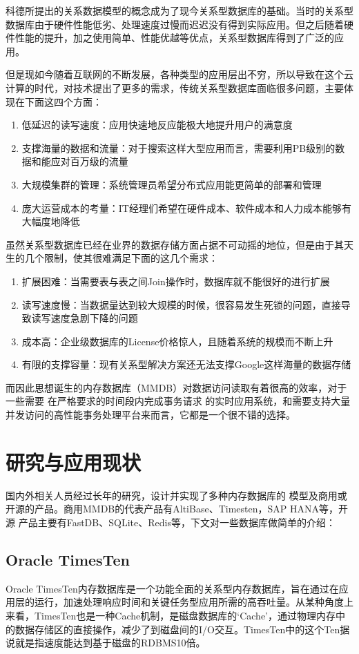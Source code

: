 \documentclass{zjutthesis}
\begin{document}
科德所提出的关系数据模型的概念成为了现今关系型数据库的基础。当时的关系型数据库由于硬件性能低劣、处理速度过慢而迟迟没有得到实际应用。但之后随着硬件性能的提升，加之使用简单、性能优越等优点，关系型数据库得到了广泛的应用。

但是现如今随着互联网的不断发展，各种类型的应用层出不穷，所以导致在这个云计算的时代，对技术提出了更多的需求，传统关系型数据库面临很多问题，主要体现在下面这四个方面：
\begin{enumerate}[label=（\arabic*）]
\item{低延迟的读写速度：应用快速地反应能极大地提升用户的满意度}
\item{支撑海量的数据和流量：对于搜索这样大型应用而言，需要利用PB级别的数据和能应对百万级的流量}
\item{大规模集群的管理：系统管理员希望分布式应用能更简单的部署和管理}
\item{庞大运营成本的考量：IT经理们希望在硬件成本、软件成本和人力成本能够有大幅度地降低}
\end{enumerate}

虽然关系型数据库已经在业界的数据存储方面占据不可动摇的地位，但是由于其天生的几个限制，使其很难满足下面的这几个需求：
\begin{enumerate}[label=（\arabic*）]
\item{扩展困难：当需要表与表之间Join操作时，数据库就不能很好的进行扩展}
\item{读写速度慢：当数据量达到较大规模的时候，很容易发生死锁的问题，直接导致读写速度急剧下降的问题}
\item{成本高：企业级数据库的License价格惊人，且随着系统的规模而不断上升}
\item{有限的支撑容量：现有关系型解决方案还无法支撑Google这样海量的数据存储}
\end{enumerate}

而因此思想诞生的内存数据库（MMDB）对数据访问读取有着很高的效率，对于一些需要
在严格要求的时间段内完成事务请求
的实时应用系统，和需要支持大量并发访问的高性能事务处理平台来而言，它都是一个很不错的选择。

\section{研究与应用现状}
国内外相关人员经过长年的研究，设计并实现了多种内存数据库的
模型及商用或开源的产品。商用MMDB的代表产品有AltiBase、Timesten，SAP HANA等，开源
产品主要有FastDB、SQLite、Redis等，下文对一些数据库做简单的介绍：

\subsection{Oracle TimesTen}
Oracle TimesTen内存数据库是一个功能全面的关系型内存数据库，旨在通过在应用层的运行，加速处理响应时间和关键任务型应用所需的高吞吐量。从某种角度上来看，TimesTen也是一种Cache机制，是磁盘数据库的‘Cache’，通过物理内存中的数据存储区的直接操作，减少了到磁盘间的I/O交互。TimesTen中的这个Ten据说就是指速度能达到基于磁盘的RDBMS10倍。
\end{document}
